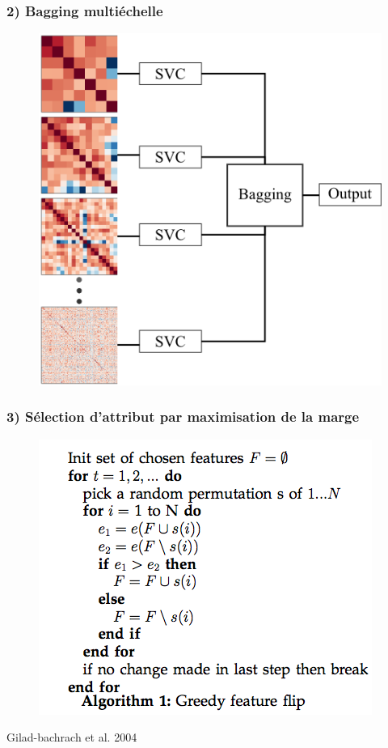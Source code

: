 \documentclass{beamer}
\begin{document}
\begin{frame}
\frametitle{2) Bagging multiéchelle}
\begin{figure}
\begin{center}
\includegraphics[scale=1.]{../figures/bagging_multiscale.png}
\end{center}
\end{figure}
\end{frame}

\begin{frame}
\frametitle{3) Sélection d'attribut par maximisation de la marge}
\begin{figure}
\begin{center}
\includegraphics[scale=.5]{../figures/gflip.png}
\end{center}
\end{figure}
\tiny{Gilad-bachrach et al. 2004}
\end{frame}
\end{document}
